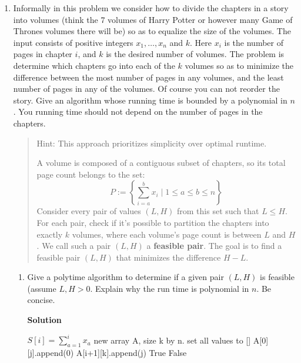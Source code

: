 \documentclass[letterpaper,12pt]{article}
\begin{document}
\begin{enumerate}
\item Informally in this problem we consider how to divide the chapters in a story into volumes (think the 7 volumes of Harry Potter
or however many Game of Thrones volumes there will be) so as to equalize the size of the volumes. 
The input consists of positive integers $x_1, \ldots, x_n$ and $k$. Here $x_i$ is the number of pages in chapter $i$, and $k$ is the desired number of volumes. The problem is determine which chapters go
into each of the $k$ volumes so as to minimize the difference between the most number of pages in
any volumes, and the least number of pages in any of the volumes. Of course you can not reorder the story. 
Give an algorithm whose running time is bounded by a  polynomial in $n$. You running time should not
depend on the number of pages in the chapters. 


\smallskip
\begin{quote}
Hint: This approach prioritizes simplicity over optimal runtime.

A volume is composed of a contiguous subset of chapters, so its total page count belongs to the set:
\[
P := \left\{ \sum_{i=a}^{b} x_i \mid 1 \le a \le b \le n \right\}
\]
Consider every pair of values $(L, H)$ from this set such that $L \le H$. For each pair, check if it's possible to partition the chapters into exactly $k$ volumes, where each volume's page count is between $L$ and $H$. We call such a pair $(L, H)$ a \textbf{feasible pair}. The goal is to find a feasible pair $(L, H)$ that minimizes the difference $H-L$. 

\end{quote}

\begin{enumerate}
\item Give a polytime algorithm to determine if a given pair $(L, H)$ is feasible (assume $L, H >0 $. Explain why the run time is polynomial in $n$. Be concise. 


\textbf{Solution}




\begin{algorithmic}[1]
    \State \(S[i] = \sum_{a=1}^i x_a\)
    \State new array A, size k by n. set all values to []
     \label{line:init}
            \State A[0][j].append(0)
        \EndIf
    \EndFor
     \label{line:startl}
                        \State A[i+1][k].append(j)
                    \EndIf
                \EndFor
            \EndIf
        \EndFor
    \EndFor\label{line:endl}
        \State \Return True
    \EndIf
    \State \Return False
\end{algorithmic}


\end{enumerate}
\end{enumerate}
\end{document}

